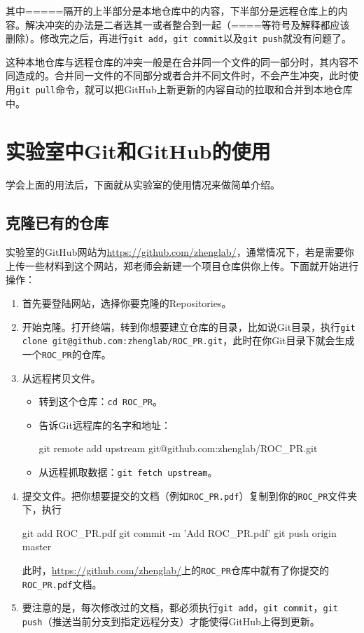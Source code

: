 \documentclass[a4paper,12pt]{article}
\begin{document}
其中=====隔开的上半部分是本地仓库中的内容，下半部分是远程仓库上的内容。解决冲突的办法是二者选其一或者整合到一起（====等符号及解释都应该删除）。修改完之后，再进行\lstinline|git add|，\lstinline|git commit|以及\lstinline|git push|就没有问题了。

这种本地仓库与远程仓库的冲突一般是在合并同一个文件的同一部分时，其内容不同造成的。合并同一文件的不同部分或者合并不同文件时，不会产生冲突，此时使用\lstinline|git pull|命令，就可以把GitHub上新更新的内容自动的拉取和合并到本地仓库中。

\section{实验室中Git和GitHub的使用}

学会上面的用法后，下面就从实验室的使用情况来做简单介绍。

\subsection{克隆已有的仓库}

实验室的GitHub网站为\url{https://github.com/zhenglab/}，通常情况下，若是需要你上传一些材料到这个网站，郑老师会新建一个项目仓库供你上传。下面就开始进行操作：
\begin{enumerate}
\item 首先要登陆网站，选择你要克隆的Repositories。
\item 开始克隆。打开终端，转到你想要建立仓库的目录，比如说Git目录，执行\lstinline|git clone git@github.com:zhenglab/ROC_PR.git|，此时在你Git目录下就会生成一个\verb|ROC_PR|的仓库。
\item 从远程拷贝文件\cite{6:misc}。
\begin{itemize}
\item 转到这个仓库：\lstinline|cd ROC_PR|。
\item 告诉Git远程库的名字和地址：
\begin{bash}
git remote add upstream git@github.com:zhenglab/ROC_PR.git
\end{bash}
\item 从远程抓取数据：\lstinline|git fetch upstream|。
\end{itemize}
\item 提交文件。把你想要提交的文档（例如\verb|ROC_PR.pdf|）复制到你的\verb|ROC_PR|文件夹下，执行
\begin{bash}
git add ROC_PR.pdf
git commit -m 'Add ROC_PR.pdf'
git push origin master
\end{bash}
此时，\url{https://github.com/zhenglab/}上的\verb|ROC_PR|仓库中就有了你提交的\verb|ROC_PR.pdf|文档。
\item 要注意的是，每次修改过的文档，都必须执行\lstinline|git add|，\lstinline|git commit|，\lstinline|git push|（推送当前分支到指定远程分支）才能使得GitHub上得到更新。
\end{enumerate}
\end{document}
